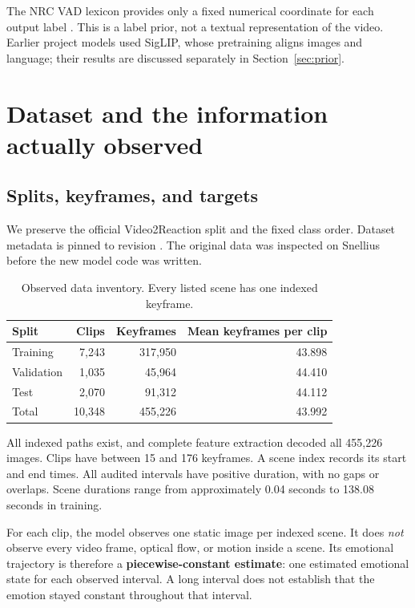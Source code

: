 \documentclass[11pt,a4paper]{article}
\begin{document}
The NRC VAD lexicon provides only a fixed numerical coordinate for each output label \cite{nrc}. This is a label prior, not a textual representation of the video. Earlier project models used SigLIP, whose pretraining aligns images and language; their results are discussed separately in Section~\ref{sec:prior}.

\section{Dataset and the information actually observed}
\subsection{Splits, keyframes, and targets}
We preserve the official Video2Reaction split and the fixed class order. Dataset metadata is pinned to revision  \cite{dataset}. The original data was inspected on Snellius before the new model code was written.

\begin{table}[htbp]\centering
\caption{Observed data inventory. Every listed scene has one indexed keyframe.}
\begin{tabular}{lrrr}\toprule
Split & Clips & Keyframes & Mean keyframes per clip\\\midrule
Training & 7,243 & 317,950 & 43.898\\
Validation & 1,035 & 45,964 & 44.410\\
Test & 2,070 & 91,312 & 44.112\\\midrule
Total & 10,348 & 455,226 & 43.992\\\bottomrule
\end{tabular}\end{table}

All indexed paths exist, and complete feature extraction decoded all 455,226 images. Clips have between 15 and 176 keyframes. A scene index records its start and end times. All audited intervals have positive duration, with no gaps or overlaps. Scene durations range from approximately 0.04 seconds to 138.08 seconds in training.

For each clip, the model observes one static image per indexed scene. It does \emph{not} observe every video frame, optical flow, or motion inside a scene. Its emotional trajectory is therefore a \textbf{piecewise-constant estimate}: one estimated emotional state for each observed interval. A long interval does not establish that the emotion stayed constant throughout that interval.
\end{document}
